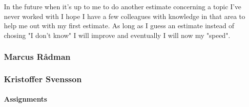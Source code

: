 In the future when it's up to me to do another estimate concerning a topic I've never worked with I hope I have a few colleagues with knowledge in that area to help me out with my first estimate.
As long as I guess an estimate instead of chosing "I don't know" I will improve and eventually I will now my "speed".

\subsubsection{Marcus Rådman}
\subsubsection{Kristoffer Svensson}
\paragraph{Assignments}
